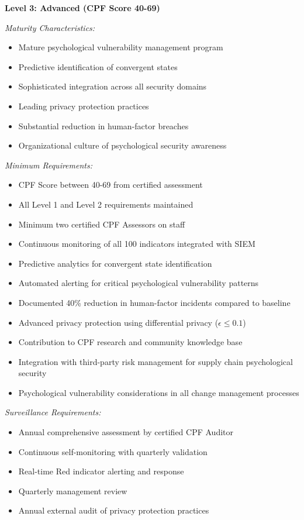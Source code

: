 \documentclass[11pt,a4paper]{article}
\begin{document}
\textbf{Level 3: Advanced (CPF Score 40-69)}

\textit{Maturity Characteristics:}
\begin{itemize}
\item Mature psychological vulnerability management program
\item Predictive identification of convergent states
\item Sophisticated integration across all security domains
\item Leading privacy protection practices
\item Substantial reduction in human-factor breaches
\item Organizational culture of psychological security awareness
\end{itemize}

\textit{Minimum Requirements:}
\begin{itemize}
\item CPF Score between 40-69 from certified assessment
\item All Level 1 and Level 2 requirements maintained
\item Minimum two certified CPF Assessors on staff
\item Continuous monitoring of all 100 indicators integrated with SIEM
\item Predictive analytics for convergent state identification
\item Automated alerting for critical psychological vulnerability patterns
\item Documented 40\% reduction in human-factor incidents compared to baseline
\item Advanced privacy protection using differential privacy ($\epsilon \leq 0.1$)
\item Contribution to CPF research and community knowledge base
\item Integration with third-party risk management for supply chain psychological security
\item Psychological vulnerability considerations in all change management processes
\end{itemize}

\textit{Surveillance Requirements:}
\begin{itemize}
\item Annual comprehensive assessment by certified CPF Auditor
\item Continuous self-monitoring with quarterly validation
\item Real-time Red indicator alerting and response
\item Quarterly management review
\item Annual external audit of privacy protection practices
\end{itemize}
\end{document}
